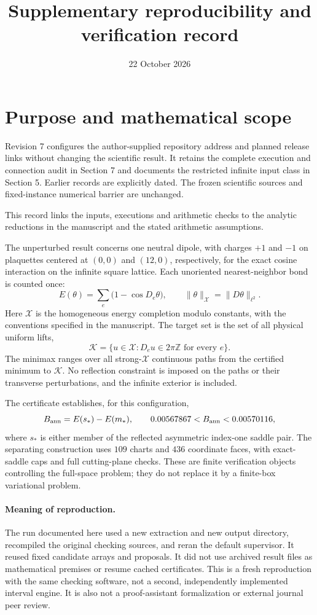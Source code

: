 \documentclass[10pt]{article}
\title{Supplementary reproducibility and verification record}
\author{}
\date{22 October 2026}
\newcommand{\X}{\mathcal X}
\begin{document}
\maketitle
\vspace{-2em}

\section{Purpose and mathematical scope}

Revision 7 configures the author-supplied repository address and planned
release links without changing the scientific result. It retains the complete execution and connection audit in
Section 7 and documents the restricted infinite input class in Section 5.
Earlier records are explicitly dated. The frozen scientific sources and
fixed-instance numerical barrier are unchanged.

This record links the inputs, executions and arithmetic checks to the
analytic reductions in the manuscript and the stated arithmetic assumptions.

The unperturbed result concerns one neutral dipole, with charges $+1$ and
$-1$ on plaquettes centered at $(0,0)$ and $(12,0)$, respectively, for the
exact cosine interaction on the infinite square lattice. Each unoriented
nearest-neighbor bond is counted once:
\[
 E(\theta)=\sum_e\bigl(1-\cos D_e\theta\bigr),\qquad
 \|\theta\|_\X=\|D\theta\|_{\ell^2}.
\]
Here $\X$ is the homogeneous energy completion modulo constants, with the
conventions specified in the manuscript. The target set is the set of all
physical uniform lifts,
\[
 \mathcal K=\{u\in\X:D_eu\in2\pi\mathbb Z\text{ for every }e\}.
\]
The minimax ranges over all strong-$\X$ continuous paths from the certified
minimum to $\mathcal K$. No reflection constraint is imposed on the paths
or their transverse perturbations, and the infinite exterior is included.

The certificate establishes, for this configuration,
\[
 B_{\rm ann}=E(s_*)-E(m_*),\qquad
 0.00567867<B_{\rm ann}<0.00570116,
\]
where $s_*$ is either member of the reflected asymmetric index-one saddle
pair. The separating construction uses $109$ charts and $436$ coordinate
faces, with exact-saddle caps and full cutting-plane checks. These are
finite verification objects controlling the full-space problem; they do
not replace it by a finite-box variational problem.

\paragraph{Meaning of reproduction.}
The run documented here used a new extraction and new output directory,
recompiled the original checking sources, and reran the default supervisor.
It reused fixed candidate arrays and proposals. It did not use archived
result files as mathematical premises or resume cached certificates.
This is a fresh reproduction with the same checking software, not a
second, independently implemented interval engine. It is also not a
proof-assistant formalization or external journal peer review.
\end{document}
